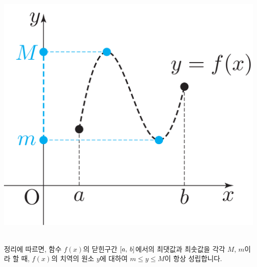 \clearpage\begin{center} \includegraphics[scale=\pgfkeysvalueof{picsize}]{DBs/pic/zerg_05.pdf}\
	\end{center}\Mmi{} 정리에 따르면, 함수 $f\left( x \right) $의 닫힌구간 $\left[a,\: b\right]$에서의 최댓값과 최솟값을 각각 $M$, $m$이라 할 때, $f\left( x \right) $의 치역의 원소 $y$에 대하여 $m \le y \le M$이 항상 성립합니다.

